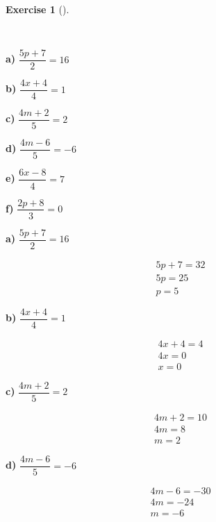 \documentclass[
  letterpaper,
  DIV=11,
  numbers=noendperiod]{scrreprt}
\theoremstyle{definition}
\newtheorem{exercise}{Exercise}[chapter]
\theoremstyle{remark}
\begin{document}
\begin{exercise}[]\protect\hypertarget{exr-u5-13}{}\label{exr-u5-13}

~

\textbf{a)} \(\displaystyle \dfrac{5p + 7}{2} = 16\)

\textbf{b)} \(\displaystyle \dfrac{4x + 4}{4} = 1\)

\textbf{c)} \(\displaystyle \dfrac{4m + 2}{5} = 2\)

\textbf{d)} \(\displaystyle \dfrac{4m - 6}{5} = -6\)

\textbf{e)} \(\displaystyle \dfrac{6x - 8}{4} = 7\)

\textbf{f)} \(\displaystyle \dfrac{2p + 8}{3} = 0\)

\begin{tcolorbox}[enhanced jigsaw, opacitybacktitle=0.6, coltitle=black, arc=.35mm, colframe=quarto-callout-tip-color-frame, colback=white, bottomrule=.15mm, left=2mm, colbacktitle=quarto-callout-tip-color!10!white, titlerule=0mm, opacityback=0, title=\textcolor{quarto-callout-tip-color}{\faLightbulb}\hspace{0.5em}{🔍 View Solutions}, leftrule=.75mm, breakable, rightrule=.15mm, bottomtitle=1mm, toptitle=1mm, toprule=.15mm]

\textbf{a)} \(\displaystyle \dfrac{5p + 7}{2} = 16\)

\begin{align*}
5p + 7 = 32 \\ 5p = 25 \\ p = 5
\end{align*}

\textbf{b)} \(\displaystyle \dfrac{4x + 4}{4} = 1\)

\begin{align*}
4x + 4 = 4 \\ 4x = 0 \\ x = 0
\end{align*}

\textbf{c)} \(\displaystyle \dfrac{4m + 2}{5} = 2\)

\begin{align*}
4m + 2 = 10 \\ 4m = 8 \\ m = 2
\end{align*}

\textbf{d)} \(\displaystyle \dfrac{4m - 6}{5} = -6\)

\begin{align*}
4m - 6 = -30 \\ 4m = -24 \\ m = -6
\end{align*}


\end{tcolorbox}
\end{exercise}
\end{document}
